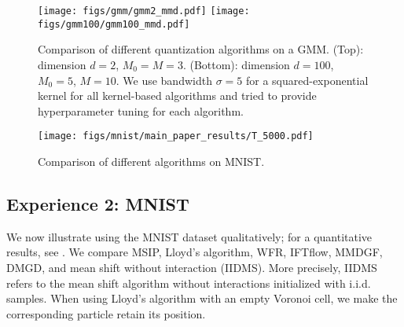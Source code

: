 \begin{figure}[!ht]
    \centering
    \texttt{[image: figs/gmm/gmm2\_mmd.pdf]}
    \texttt{[image: figs/gmm100/gmm100\_mmd.pdf]}
    \caption{Comparison of different quantization algorithms on a GMM. (Top): dimension $d=2$, $M_0 = M = 3$. (Bottom): dimension $d=100$, $M_0=5$, $M=10$. We use bandwidth $\sigma=5$ for a squared-exponential kernel for all kernel-based algorithms and tried to provide hyperparameter tuning for each algorithm.}
    \label{fig:mmd_comparison_gmm}
\end{figure}






\begin{figure}[b!]
    \centering
    \texttt{[image: figs/mnist/main\_paper\_results/T\_5000.pdf]}
    





    

    \caption{Comparison of different algorithms on MNIST. }
    \label{fig:mnist_comparison}
\end{figure}






















\subsection{Experience 2: MNIST} \label{sec:real_datasets_basic_numerics}

We now illustrate using the MNIST dataset qualitatively; for a quantitative results, see . We compare MSIP, Lloyd's algorithm, WFR, IFTflow, MMDGF, DMGD, and mean shift without interaction (IIDMS). More precisely, IIDMS refers to the mean shift algorithm without interactions initialized with i.i.d. samples. 
When using Lloyd's algorithm with an empty Voronoi cell, we make the corresponding particle retain its position.

